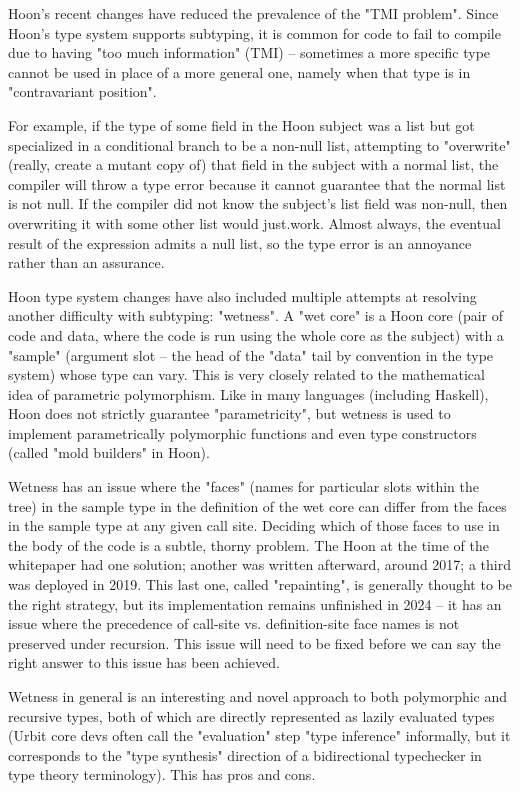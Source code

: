 \documentclass[twoside]{article}
\begin{document}
Hoon's recent changes have reduced the prevalence of the "TMI problem".  Since Hoon's type system supports subtyping, it is common for code to fail to compile due to having "too much information" (TMI) – sometimes a more specific type cannot be used in place of a more general one, namely when that type is in "contravariant position".

For example, if the type of some field in the Hoon subject was a list but got specialized in a conditional branch to be a non-null list, attempting to "overwrite" (really, create a mutant copy of) that field in the subject with a normal list, the compiler will throw a type error because it cannot guarantee that the normal list is not null.  If the compiler did not know the subject's list field was non-null, then overwriting it with some other list would just.work.  Almost always, the eventual result of the expression admits a null list, so the type error is an annoyance rather than an assurance.

Hoon type system changes have also included multiple attempts at resolving another difficulty with subtyping: "wetness".  A "wet core" is a Hoon core (pair of code and data, where the code is run using the whole core as the subject) with a "sample" (argument slot – the head of the "data" tail by convention in the type system) whose type can vary.  This is very closely related to the mathematical idea of parametric polymorphism.  Like in many languages (including Haskell), Hoon does not strictly guarantee "parametricity", but wetness is used to implement parametrically polymorphic functions and even type constructors (called "mold builders" in Hoon).

Wetness has an issue where the "faces" (names for particular slots within the tree) in the sample type in the definition of the wet core can differ from the faces in the sample type at any given call site.  Deciding which of those faces to use in the body of the code is a subtle, thorny problem.  The Hoon at the time of the whitepaper had one solution; another was written afterward, around 2017; a third was deployed in 2019.  This last one, called "repainting", is generally thought to be the right strategy, but its implementation remains unfinished in 2024 – it has an issue where the precedence of call-site vs. definition-site face names is not preserved under recursion.  This issue will need to be fixed before we can say the right answer to this issue has been achieved.

Wetness in general is an interesting and novel approach to both polymorphic and recursive types, both of which are directly represented as lazily evaluated types (Urbit core devs often call the "evaluation" step "type inference" informally, but it corresponds to the "type synthesis" direction of a bidirectional typechecker in type theory terminology).  This has pros and cons.
\end{document}
